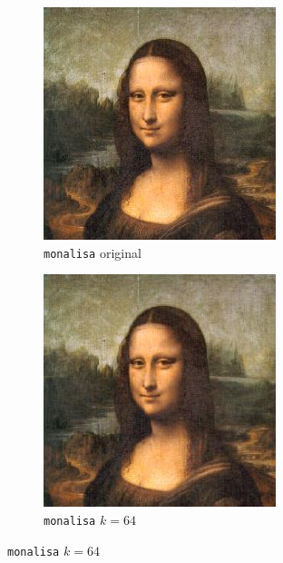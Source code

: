 \documentclass[brazilian,a4paper,twocolumn]{article}
\begin{document}
    \begin{figure}[H]
        \centering
        \begin{subfigure}{0.23\textwidth}
            \includegraphics[width=\textwidth,keepaspectratio]{monalisa}
            \caption{\texttt{monalisa} original}
            \label{fig:monalisa-original}
        \end{subfigure}
        \begin{subfigure}{0.23\textwidth}
            \includegraphics[width=\textwidth,keepaspectratio]{monalisa-64}
            \caption{\texttt{monalisa} $k=64$}
            \label{fig:monalisa-64}
        \end{subfigure}


\end{figure}
\end{document}

